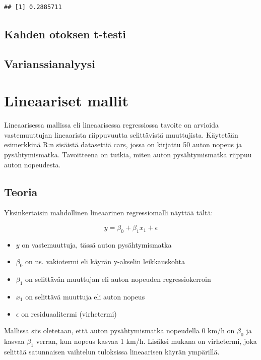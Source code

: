 \documentclass[
]{book}
\providecommand{\tightlist}{%
  \setlength{\itemsep}{0pt}\setlength{\parskip}{0pt}}
\begin{document}
\begin{verbatim}
## [1] 0.2885711
\end{verbatim}

\hypertarget{kahden-otoksen-t-testi}{%
\section{Kahden otoksen t-testi}\label{kahden-otoksen-t-testi}}

\hypertarget{varianssianalyysi}{%
\section{Varianssianalyysi}\label{varianssianalyysi}}

\hypertarget{linear_models}{%
\chapter{Lineaariset mallit}\label{linear_models}}

Lineaarisessa mallissa eli lineaarisessa regressiossa tavoite on arvioida vastemuuttujan lineaarista riippuvuutta selittävistä muuttujista. Käytetään esimerkkinä R:n sisäistä datasettiä cars, jossa on kirjattu 50 auton nopeus ja pysähtymismatka. Tavoitteena on tutkia, miten auton pysähtymismatka riippuu auton nopeudesta.

\hypertarget{teoria}{%
\section{Teoria}\label{teoria}}

Yksinkertaisin mahdollinen lineaarinen regressiomalli näyttää tältä:

\[y = \beta_0 + \beta_1 x_1 + \epsilon\]

\begin{itemize}
\tightlist
\item
  \(y\) on vastemuuttuja, tässä auton pysähtymismatka
\item
  \(\beta_0\) on ns. vakiotermi eli käyrän y-akselin leikkauskohta
\item
  \(\beta_1\) on selittävän muuttujan eli auton nopeuden regressiokerroin
\item
  \(x_1\) on selittävä muuttuja eli auton nopeus
\item
  \(\epsilon\) on residuaalitermi (virhetermi)
\end{itemize}

Mallissa siis oletetaan, että auton pysähtymismatka nopeudella 0 km/h on \(\beta_0\) ja kasvaa \(\beta_1\) verran, kun nopeus kasvaa 1 km/h. Lisäksi mukana on virhetermi, joka selittää satunnaisen vaihtelun tuloksissa lineaarisen käyrän ympärillä.
\end{document}
